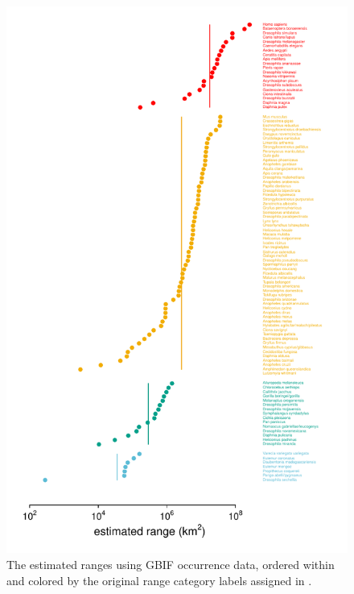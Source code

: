 \documentclass[11pt]{article}
\begin{document}
\begin{figure}[!htb]
  \centering
  \includegraphics[]{figures/range_categories.pdf}

  \caption{The estimated ranges using GBIF occurrence data, ordered within and
    colored by the original range category labels assigned in
  \textcite{Leffler2012-zj}.}

  \label{suppfig:range-cats}
\end{figure}
\end{document}
